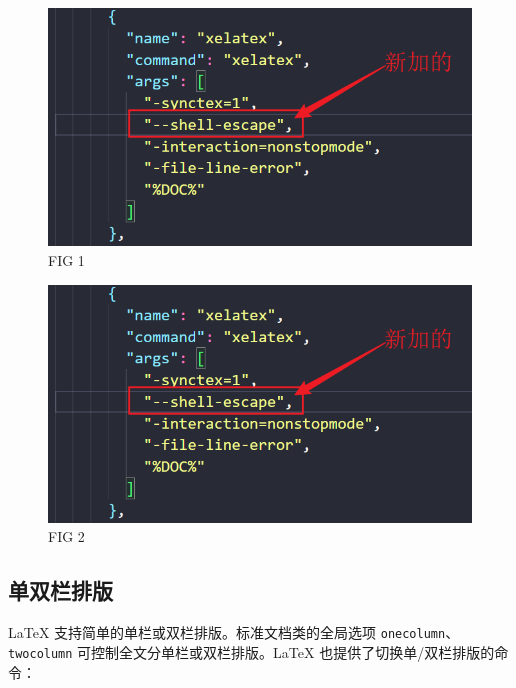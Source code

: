 \documentclass[fontset=windows, 12pt]{article}
\begin{document}
\begin{figure}
    \centering
    \includegraphics[scale=0.3]{JSON.png}
    \caption{FIG 1}
\end{figure}
\blindtext

\begin{figure}
    \centering
    \includegraphics[scale=0.3]{JSON.png}
    \caption{FIG 2}
\end{figure}
\blindtext

\newpage
\subsection{单双栏排版}
\LaTeX{} 支持简单的单栏或双栏排版。标准文档类的全局选项 \texttt{onecolumn}、\texttt{twocolumn}
可控制全文分单栏或双栏排版。\LaTeX{} 也提供了切换单/双栏排版的命令：
\begin{command}
 \\
\end{command}
\end{document}
